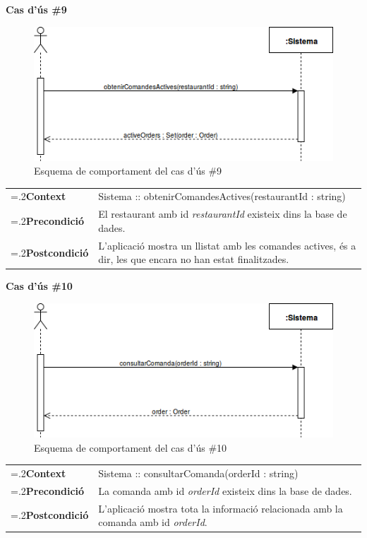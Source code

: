 \clearpage
\noindent\textbf{\large Cas d'ús \#9}\\
\begin{figure}[H]
\centering
\includegraphics[scale=0.6]{Figures/casdus_09.png}
\caption{Esquema de comportament del cas d'ús \#9}
\end{figure}
\begin{table}[h]
\noindent
\begin{tabularx}{\linewidth}{
>{\hsize=.2\hsize}X%
>{\hsize=0.8\hsize}X%
}
\textbf{Context} 		& Sistema :: obtenirComandesActives(restaurantId : string) \\
\textbf{Precondició} 	& El restaurant amb id \textit{restaurantId} existeix dins la base de dades. \\
\textbf{Postcondició}	& L'aplicació mostra un llistat amb les comandes actives, és a dir, les que encara no han estat finalitzades. \\
\end{tabularx}
\label{}
\end{table}

\noindent\textbf{\large Cas d'ús \#10}\\
\begin{figure}[H]
\centering
\includegraphics[scale=0.6]{Figures/casdus_10.png}
\caption{Esquema de comportament del cas d'ús \#10}
\end{figure}
\begin{table}[h]
\noindent
\begin{tabularx}{\linewidth}{
>{\hsize=.2\hsize}X%
>{\hsize=0.8\hsize}X%
}
\textbf{Context} 		& Sistema :: consultarComanda(orderId : string) \\
\textbf{Precondició} 	& La comanda amb id \textit{orderId} existeix dins la base de dades. \\
\textbf{Postcondició}	& L'aplicació mostra tota la informació relacionada amb la comanda amb id \textit{orderId}. \\
\end{tabularx}
\label{}
\end{table}

